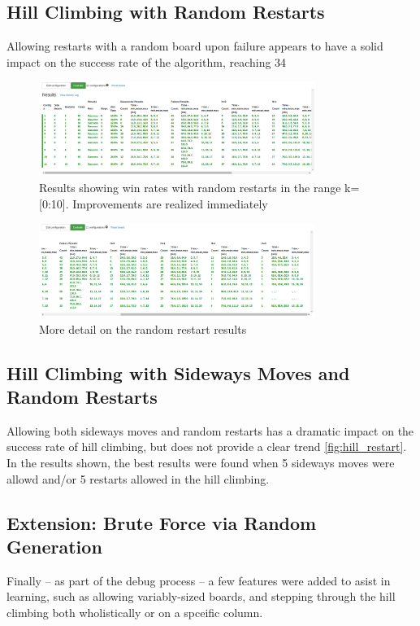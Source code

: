 \subsection{Hill Climbing with Random Restarts}
Allowing restarts with a random board upon failure appears to have a solid impact on the success rate of the algorithm,
reaching 34%

\begin{figure}[ht!]
\centering
\includegraphics[width=90mm]{img/restart.png}
\caption{Results showing win rates with random restarts in the range k=[0:10]. Improvements are realized immediately}
\label{fig:ui}
\end{figure}

\begin{figure}[ht!]
\centering
\includegraphics[width=90mm]{img/restart2.png}
\caption{More detail on the random restart results}
\label{fig:ui}
\end{figure}

\subsection{Hill Climbing with Sideways Moves and Random Restarts}
Allowing both sideways moves and random restarts has a dramatic impact on the success rate of hill climbing, but does
not provide a clear trend \ref{fig:hill_restart}. In the results shown, the best results were found when 5 sideways moves
were allowd and/or 5 restarts allowed in the hill climbing.



\subsection{Extension: Brute Force via Random Generation}
Finally -- as part of the debug process -- a few features were added to asist in learning, such as allowing
variably-sized boards, and stepping through the hill climbing both wholistically or on a spceific column.
